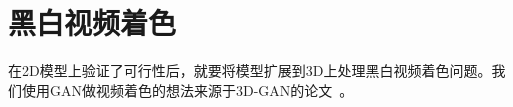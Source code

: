 \chapter{黑白视频着色}
\label{cha:4-video-color}

  在2D模型上验证了可行性后，就要将模型扩展到3D上处理黑白视频着色问题。我们使用GAN做视频着色的想法来源于3D-GAN的论文~\cite{DBLP:conf/nips/0001ZXFT16}。